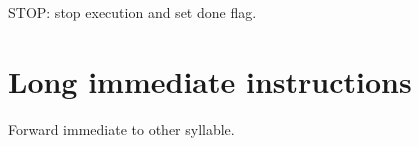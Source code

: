 STOP: stop execution and set done flag.

\section{Long immediate instructions}

\noasm{}
Forward immediate to other syllable.

